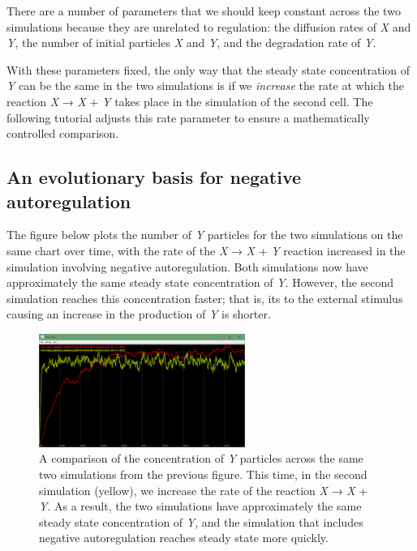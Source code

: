 There are a number of parameters that we should keep constant across the two simulations because they are unrelated to regulation: the diffusion rates of \textit{X} and \textit{Y}, the number of initial particles \textit{X} and \textit{Y}, and the degradation rate of \textit{Y}.

With these parameters fixed, the only way that the steady state concentration of \textit{Y} can be the same in the two simulations is if we \textit{increase} the rate at which the reaction \textit{X} → \textit{X} + \textit{Y} takes place in the simulation of the second cell. The following tutorial adjusts this rate parameter to ensure a mathematically controlled comparison.


\FloatBarrier
{}
\subsection{An evolutionary basis for negative autoregulation}

The figure below plots the number of \textit{Y} particles for the two simulations on the same chart over time, with the rate of the \textit{X} → \textit{X} + \textit{Y} reaction increased in the simulation involving negative autoregulation. Both  simulations now have approximately the same steady state concentration of \textit{Y}. However, the second simulation reaches this concentration faster; that is, its  to the external stimulus causing an increase in the production of \textit{Y} is shorter.

\begin{figure}[h]
\centering
\mySfFamily
\includegraphics[width = 0.6\textwidth]{../assets/images/600px/nar_equal_chart.png}
\caption{A comparison of the concentration of \textit{Y} particles across the same two simulations from the previous figure. This time, in the second simulation (yellow), we increase the rate of the reaction \textit{X} → \textit{X} + \textit{Y}.  As a result, the two simulations have approximately the same steady state concentration of \textit{Y}, and the simulation that includes negative autoregulation reaches steady state more quickly.}
\label{fig:nar_equal_chart}
\end{figure}


